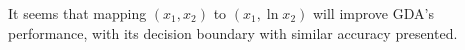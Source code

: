 \begin{answer}
	It seems that mapping $(x_1, x_2)$ to $(x_1, \ln x_2)$ will improve GDA's performance, with its decision boundary with similar accuracy presented. 
\end{answer}